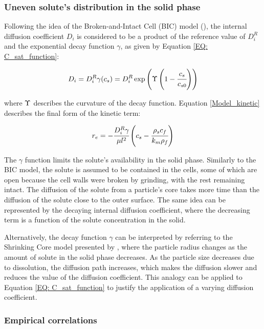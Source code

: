 \documentclass[../Article_Model_Parameters.tex]{subfiles}
\begin{document}
	
	\subsubsection{Uneven solute's distribution in the solid phase} \label{CH: Gamma_Function}
			
	Following the idea of the Broken-and-Intact Cell (BIC) model (\citet{Sovova2017}), the internal diffusion coefficient $D_i$ is considered to be a product of the reference value of $D_i^R$ and the exponential decay function $\gamma$, as given by Equation \ref{EQ: C_sat_function}:
	
	{\footnotesize
		\begin{equation}
			D_i = D_i^R \gamma(c_s) = D_i^R \exp \left( \Upsilon \left( 1-\cfrac{ c_s }{c_{s0}} \right) \right) \label{EQ: C_sat_function}
	\end{equation} }
	
	where  ${\color{black}\Upsilon}$ describes the curvature of the decay function. Equation \ref{Model_kinetic} describes the final form of the kinetic term:
	
	{\footnotesize
		\begin{equation}
			\label{Model_kinetic}
			r_e = -\cfrac{D_i^R \gamma }{ \mu l^2 } \left( c_s  - \cfrac{\rho_s c_f }{ k_m \rho_f }  \right)
	\end{equation} }
	
	The $\gamma$ function limits the solute's availability in the solid phase. Similarly to the BIC model, the solute is assumed to be contained in the cells, some of which are open because the cell walls were broken by grinding, with the rest remaining intact. The diffusion of the solute from a particle's core takes more time than the diffusion of the solute close to the outer surface. The same idea can be represented by the decaying internal diffusion coefficient, where the decreasing term is a function of the solute concentration in the solid. 
	
	Alternatively, the decay function $\gamma$ can be interpreted by referring to the Shrinking Core model presented by \citet{Goto1996}, where the particle radius changes as the amount of solute in the solid phase decreases. As the particle size decreases due to dissolution, the diffusion path increases, which makes the diffusion slower and reduces the value of the diffusion coefficient. This analogy can be applied to Equation \ref{EQ: C_sat_function} to justify the application of a varying diffusion coefficient.
	
	\subsubsection{Empirical correlations}
	
\end{document}
